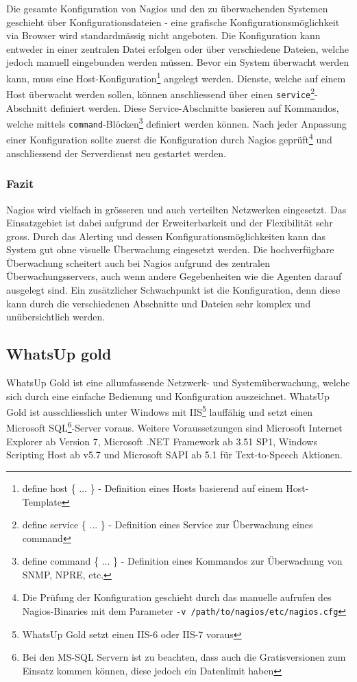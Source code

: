   Die gesamte Konfiguration von Nagios und den zu \"uberwachenden Systemen geschieht \"uber Konfigurationsdateien - eine grafische Konfigurationsm\"oglichkeit via Browser wird standardm\"assig nicht angeboten. Die Konfiguration kann entweder in einer zentralen Datei erfolgen oder \"uber verschiedene Dateien, welche jedoch manuell eingebunden werden m\"ussen. Bevor ein System \"uberwacht werden kann, muss eine Host-Konfiguration\footnote{\label{foot:nagios-cfg-host}define host \{ ... \} - Definition eines Hosts basierend auf einem Host-Template} angelegt werden. Dienste, welche auf einem Host \"uberwacht werden sollen, k\"onnen anschliessend \"uber einen \texttt{service}\footnote{\label{foot:nagios-cfg-service}define service \{ ... \} - Definition eines Service zur \"Uberwachung eines command}-Abschnitt definiert werden. Diese Service-Abschnitte basieren auf Kommandos, welche mittels \texttt{command}-Bl\"ocken\footnote{define command \{ ... \} - Definition eines Kommandos zur \"Uberwachung von SNMP, NPRE, etc.} definiert werden k\"onnen. Nach jeder Anpassung einer Konfiguration sollte zuerst die Konfiguration durch Nagios gepr\"uft\footnote{\label{foot:nagios-config-check}Die Pr\"ufung der Konfiguration geschieht durch das manuelle aufrufen des Nagios-Binaries mit dem Parameter \texttt{-v /path/to/nagios/etc/nagios.cfg}} und anschliessend der Serverdienst neu gestartet werden.

\subsubsection{Fazit} \label{sec:systeme-nagios-fazit}
  Nagios wird vielfach in gr\"osseren und auch verteilten Netzwerken eingesetzt. Das Einsatzgebiet ist dabei aufgrund der Erweiterbarkeit und der Flexibilit\"at sehr gross. Durch das Alerting und dessen Konfigurationsm\"oglichkeiten kann das System gut ohne visuelle \"Uberwachung eingesetzt werden. Die hochverf\"ugbare \"Uberwachung scheitert auch bei Nagios aufgrund des zentralen \"Uberwachungsservers, auch wenn andere Gegebenheiten wie die Agenten darauf ausgelegt sind. Ein zus\"atzlicher Schwachpunkt ist die Konfiguration, denn diese kann durch die verschiedenen Abschnitte und Dateien sehr komplex und un\"ubersichtlich werden.


\subsection{WhatsUp gold} \label{sec:systeme-wug}  
  WhatsUp Gold\cite{whatsupgold} ist eine allumfassende Netzwerk- und System\"uberwachung, welche sich durch eine einfache Bedienung und Konfiguration auszeichnet. WhatsUp Gold ist ausschliesslich unter Windows mit IIS\footnote{\label{foot:wug-iis}WhatsUp Gold setzt einen IIS-6 oder IIS-7 voraus} lauff\"ahig und setzt einen Microsoft SQL\footnote{\label{foot:wug-sql}Bei den MS-SQL Servern ist zu beachten, dass auch die Gratisversionen zum Einsatz kommen k\"onnen, diese jedoch ein Datenlimit haben}-Server voraus. Weitere Voraussetzungen sind Microsoft Internet Explorer ab Version 7, Microsoft .NET Framework ab 3.51 SP1, Windows Scripting Host ab v5.7 und Microsoft SAPI ab 5.1 f\"ur Text-to-Speech Aktionen.


